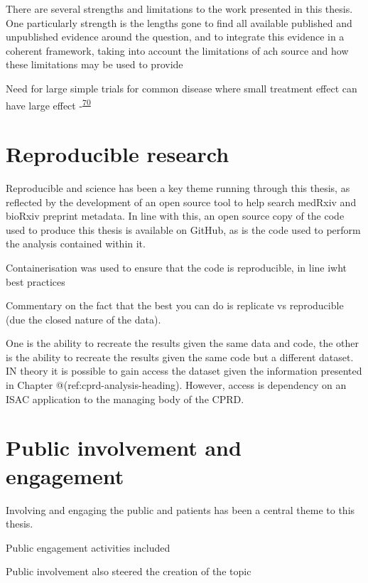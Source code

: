 \documentclass[a4paper, twoside]{templates/ociamthesis}
\begin{document}
There are several strengths and limitations to the work presented in this thesis. One particularly strength is the lengths gone to find all available published and unpublished evidence around the question, and to integrate this evidence in a coherent framework, taking into account the limitations of ach source and how these limitations may be used to provide

Need for large simple trials for common disease where small treatment effect can have large effect -\textsuperscript{\protect\hyperlink{ref-yusuf1984}{70}}

\hypertarget{reproducible-research}{%
\section{Reproducible research}\label{reproducible-research}}

Reproducible and science has been a key theme running through this thesis, as reflected by the development of an open source tool to help search medRxiv and bioRxiv preprint metadata. In line with this, an open source copy of the code used to produce this thesis is available on GitHub, as is the code used to perform the analysis contained within it.

Containerisation was used to ensure that the code is reproducible, in line iwht best practices

Commentary on the fact that the best you can do is replicate vs reproducible (due the closed nature of the data).

One is the ability to recreate the results given the same data and code, the other is the ability to recreate the results given the same code but a different dataset. IN theory it is possible to gain access the dataset given the information presented in Chapter @(ref:cprd-analysis-heading). However, access is dependency on an ISAC application to the managing body of the CPRD.

\hypertarget{public-involvement-and-engagement}{%
\section{Public involvement and engagement}\label{public-involvement-and-engagement}}

Involving and engaging the public and patients has been a central theme to this thesis.

Public engagement activities included

Public involvement also steered the creation of the topic
\end{document}
